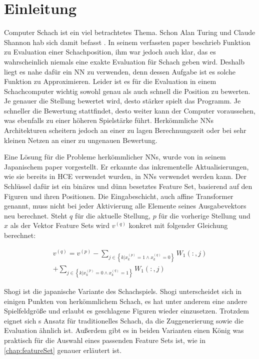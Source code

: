 \chapter{Einleitung}

Computer Schach ist ein viel betrachtetes Thema. Schon Alan Turing und Claude Shannon hab sich damit befasst \cite{Turing1953, Shannon1950}. In seinem \citeyear{Shannon1950} verfassten paper beschrieb \citeauthor{Shannon1950} \cite{Shannon1950} Funktion zu Evaluation einer Schachposition, ihm war jedoch auch klar, das es wahrscheinlich niemals eine exakte Evaluation für Schach geben wird. Deshalb liegt es nahe dafür ein \ac{NN} zu verwenden, denn dessen Aufgabe ist es solche Funktion zu Approximieren. Leider ist es für die Evaluation in einem Schachcomputer wichtig sowohl genau als auch schnell die Position zu bewerten. Je genauer die Stellung bewertet wird, desto stärker spielt das Programm. Je schneller die Bewertung stattfindet, desto weiter kann der Computer voraussehen, was ebenfalls zu einer höheren Spielstärke führt. Herkömmliche \acp{NN} Architekturen scheitern jedoch an einer zu lagen Berechnungszeit oder bei sehr kleinen Netzen an einer zu ungenauen Bewertung.

Eine Lösung für die Probleme herkömmlicher \acp{NN}, wurde \citeyear{YNasu2018} von \citeauthor{YNasu2018} \cite{YNasu2018} in seinem Japanischem paper vorgestellt. Er erkannte das inkrementelle Aktualisierungen, wie sie bereits in \ac{HCE} verwendet wurden, in \acp{NN} verwendet werden kann. Der Schlüssel dafür ist ein binäres und dünn besetztes Feature Set, basierend auf den Figuren und ihren Positionen. Die Eingabeschicht, auch affine Transformer genannt, muss nicht bei jeder Aktivierung alle Elemente seines Ausgabevektors neu berechnet. Steht $q$ für die aktuelle Stellung, $p$ für die vorherige Stellung und $x$ als der Vektor Feature Sets wird $v^{(q)}$ konkret mit folgender Gleichung berechnet:

\begin{equation}
  \begin{split}
    v^{(q)} = v^{(p)} 
              - \sum_{j \in \left \{ k | x_{k}^{(p)}=1\wedge x_{k}^{(q)}=0 \right \}}^{} W_{1}(:,j) \\
              + \sum_{j \in \left \{ k | x_{k}^{(p)}=0\wedge x_{k}^{(q)}=1 \right \}}^{} W_{1}(:,j)
  \end{split}
\end{equation}

Shogi ist die japanische Variante des Schachspiels. Shogi unterscheidet sich in einigen Punkten von herkömmlichem Schach, es hat unter anderem eine andere Spielfeldgröße und erlaubt es geschlagene Figuren wieder einzusetzen. Trotzdem eignet sich \citeauthor{YNasu2018}s \cite{YNasu2018} Ansatz für traditionelles Schach, da die Zuggenerierung sowie die Evaluation ähnlich ist. Außerdem gibt es in beiden Varianten einen König was praktisch für die Auswahl eines passenden Feature Sets ist, wie in \autoref{chap:featureSet} genauer erläutert ist.


